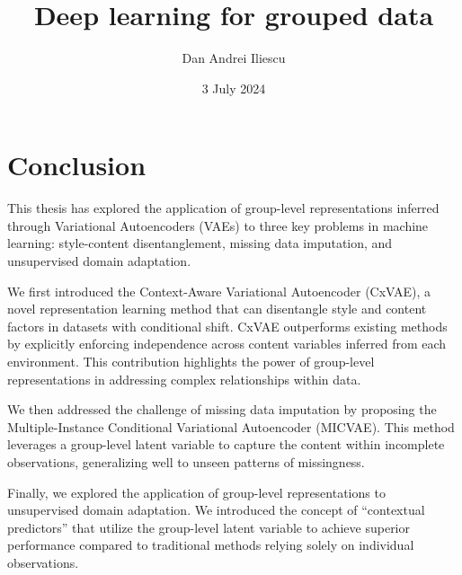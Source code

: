 \documentclass[backrefs]{cam-thesis}
\title{\bf Deep learning for grouped data}
\author{Dan Andrei Iliescu}
\date{3 July 2024}
\def\biblio{}
\begin{document}
\def\biblio{}

\frontmatter{}

\listoffigures
\listoftables












\chapter{Conclusion}

This thesis has explored the application of group-level representations inferred through Variational Autoencoders (VAEs) to three key problems in machine learning: style-content disentanglement, missing data imputation, and unsupervised domain adaptation. 

We first introduced the Context-Aware Variational Autoencoder (CxVAE), a novel representation learning method that can disentangle style and content factors in datasets with conditional shift. CxVAE outperforms existing methods by explicitly enforcing independence across content variables inferred from each environment. This contribution highlights the power of group-level representations in addressing complex relationships within data.

We then addressed the challenge of missing data imputation by proposing the Multiple-Instance Conditional Variational Autoencoder (MICVAE). This method leverages a group-level latent variable to capture the content within incomplete observations, generalizing well to unseen patterns of missingness. 

Finally, we explored the application of group-level representations to unsupervised domain adaptation. We introduced the concept of ``contextual predictors'' that utilize the group-level latent variable to achieve superior performance compared to traditional methods relying solely on individual observations. 
\end{document}
